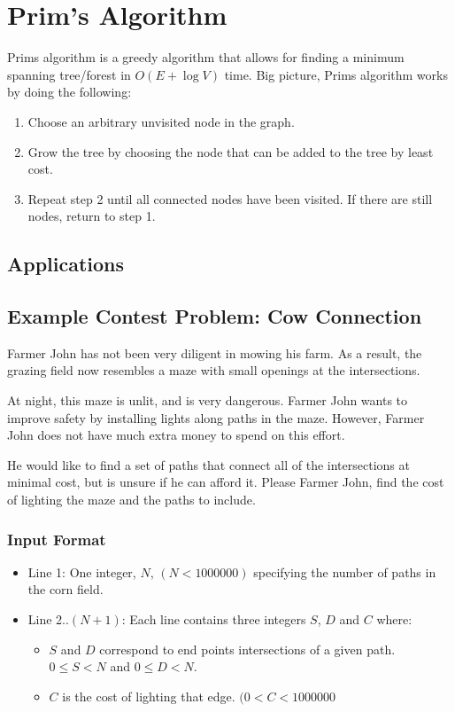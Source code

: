 \section{Prim's Algorithm}
Prims algorithm is a greedy algorithm that allows for finding a minimum spanning tree/forest in $O(E + \log{V})$ time.
Big picture, Prims algorithm works by doing the following:

\begin{enumerate}
	\item Choose an arbitrary unvisited node in the graph.
	\item Grow the tree by choosing the node that can be added to the tree by least cost.
	\item Repeat step 2 until all connected nodes have been visited.  If there are still nodes, return to step 1.
\end{enumerate}


\subsection{Applications}
\subsection{Example Contest Problem: Cow Connection}
Farmer John has not been very diligent in mowing his farm.
As a result, the grazing field now resembles a maze with small openings at the intersections.

At night, this maze is unlit, and is very dangerous.
Farmer John wants to improve safety by installing lights along paths in the maze.
However, Farmer John does not have much extra money to spend on this effort.

He would like to find a set of paths that connect all of the intersections at minimal cost, but is unsure if he can afford it.
Please Farmer John, find the cost of lighting the maze and the paths to include.
\subsubsection{Input Format}
\begin{itemize}
\item Line 1: One integer, $N$, $(N < 1000000)$ specifying the number of paths in the corn field.
\item Line 2..$(N+1)$: Each line contains three integers $S$, $D$ and $C$ where:
	\begin{itemize}
		\item $S$ and $D$ correspond to end points intersections of a given path. $0 \leq S < N$ and $0 \leq D < N$.
		\item $C$ is the cost of lighting that edge. $(0 < C < 1000000$
	\end{itemize}
\end{itemize}

